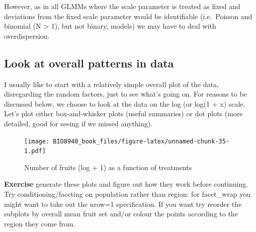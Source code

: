 \documentclass[
  12pt,
]{book}
\makeatletter
\newenvironment{kframe}{%
\medskip{}
\setlength{\fboxsep}{.8em}
\def\at@end@of@kframe{}%
\ifinner\ifhmode%
 \def\at@end@of@kframe{\end{minipage}}%
 \begin{minipage}{\columnwidth}%
\fi\fi%
\def\FrameCommand##1{\hskip\@totalleftmargin \hskip-\fboxsep
\colorbox{incolor}{##1}\hskip-\fboxsep
    \hskip-\linewidth \hskip-\@totalleftmargin \hskip\columnwidth}%
\MakeFramed {\advance\hsize-\width
  \@totalleftmargin\z@ \linewidth\hsize
  \@setminipage}}%
{\par\unskip\endMakeFramed%
\at@end@of@kframe}
\newenvironment{rmdblock}[1]
 {
 \begin{itemize}
 \renewcommand{\labelitemi}{
   \raisebox{-.7\height}[0pt][0pt]{
     {\setkeys{Gin}{width=3em,keepaspectratio}\texttt{[image: images/icons/\#1]}}
   }
 }
 \begin{kframe}
 \setlength{\fboxsep}{1em}
 \item
 }
 {
 \end{kframe}
 \end{itemize}
 }
\newenvironment{rmdcode}
  {\begin{rmdblock}{code}}
  {\end{rmdblock}}
\makeatother
\begin{document}
However, as in all GLMMs where the scale parameter is treated as fixed and deviations from the fixed scale parameter would be identifiable (i.e.~Poisson and binomial (N \textgreater{} 1), but not binary, models) we may have to deal with overdispersion.

\hypertarget{look-at-overall-patterns-in-data}{%
\subsection{Look at overall patterns in data}\label{look-at-overall-patterns-in-data}}

I usually like to start with a relatively simple overall plot of the data, disregarding the random factors, just to see what's going on. For reasons to be discussed below, we choose to look at the data on the log (or log(1 + x) scale. Let's plot either box-and-whisker plots (useful summaries) or dot plots (more detailed, good for seeing if we missed anything).

\begin{figure}
\centering
\texttt{[image: BIO8940\_book\_files/figure-latex/unnamed-chunk-35-1.pdf]}
\caption{\label{fig:unnamed-chunk-35}Number of fruits (log + 1) as a function of treatments}
\end{figure}

\begin{rmdcode}
\textbf{Exercise} generate these plots and figure out how they work before continuing. Try conditioning/faceting on population rather than region: for facet\_wrap you might want to take out the nrow=1 specification. If you want try reorder the subplots by overall mean fruit set and/or colour the points according to the region they come from.
\end{rmdcode}
\end{document}
